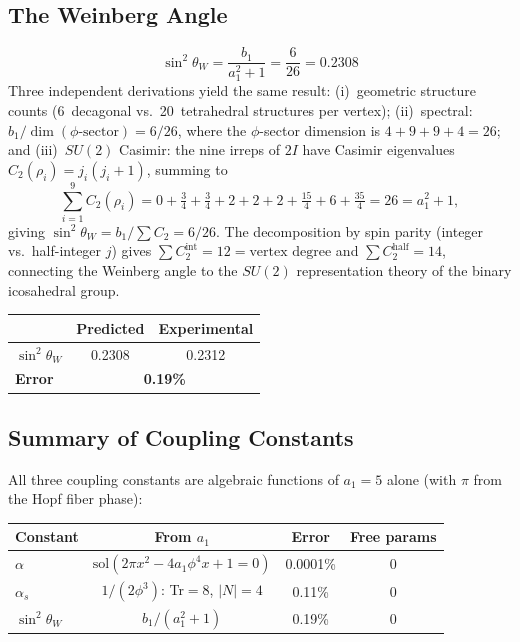 \documentclass[12pt,a4paper]{article}
\theoremstyle{definition}
\begin{document}
\subsection{The Weinberg Angle}

\begin{equation}
\boxed{\sin^2\theta_W = \frac{b_1}{a_1^2 + 1} = \frac{6}{26} = 0.2308}
\label{eq:weinberg}
\end{equation}
Three independent derivations yield the same result: (i)~geometric structure counts (6~decagonal vs.\ 20~tetrahedral structures per vertex); (ii)~spectral: $b_1 / \dim(\phi\text{-sector}) = 6/26$, where the $\phi$-sector dimension is $4 + 9 + 9 + 4 = 26$; and (iii)~$SU(2)$ Casimir: the nine irreps of $2I$ have Casimir eigenvalues $C_2(\rho_i) = j_i(j_i+1)$, summing to
\begin{equation}
\sum_{i=1}^{9} C_2(\rho_i) = 0 + \tfrac{3}{4} + \tfrac{3}{4} + 2 + 2 + 2 + \tfrac{15}{4} + 6 + \tfrac{35}{4} = 26 = a_1^2 + 1,
\label{eq:casimir_sum}
\end{equation}
giving $\sin^2\theta_W = b_1 / \sum C_2 = 6/26$.  The decomposition by spin parity (integer vs.\ half-integer $j$) gives $\sum C_2^{\text{int}} = 12 = \text{vertex degree}$ and $\sum C_2^{\text{half}} = 14$, connecting the Weinberg angle to the $SU(2)$ representation theory of the binary icosahedral group.

\begin{center}
\begin{tabular}{lcc}
\toprule
& \textbf{Predicted} & \textbf{Experimental} \\
\midrule
$\sin^2\theta_W$ & 0.2308 & 0.2312 \\
\textbf{Error} & \multicolumn{2}{c}{\textbf{0.19\%}} \\
\bottomrule
\end{tabular}
\end{center}

\subsection{Summary of Coupling Constants}

All three coupling constants are algebraic functions of $a_1 = 5$ alone (with $\pi$ from the Hopf fiber phase):

\begin{center}
\begin{tabular}{lccc}
\toprule
\textbf{Constant} & \textbf{From $a_1$} & \textbf{Error} & \textbf{Free params} \\
\midrule
$\alpha$ & $\text{sol}(2\pi x^2 - 4a_1\phi^4 x + 1 = 0)$ & 0.0001\% & 0 \\
$\alpha_s$ & $1/(2\phi^3)$: Tr$=8$, $|N|=4$ & 0.11\% & 0 \\
$\sin^2\theta_W$ & $b_1/(a_1^2+1)$ & 0.19\% & 0 \\
\bottomrule
\end{tabular}
\end{center}
\end{document}
